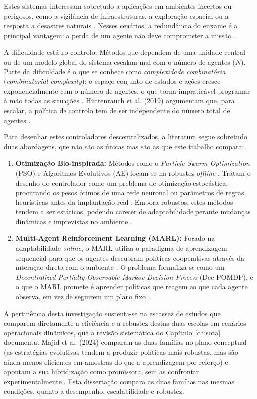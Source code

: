 \documentclass[12pt,reqno, twoside]{amsbook}
\theoremstyle{plain}
\numberwithin{equation}{chapter}
\numberwithin{section}{chapter}
\numberwithin{table}{chapter}
\numberwithin{figure}{chapter}
\begin{document}
Estes sistemas interessam sobretudo a aplicações em ambientes incertos ou perigosos, como a vigilância de infraestruturas, a exploração espacial ou a resposta a desastres naturais \cite{ekechi2025survey}. Nesses cenários, a redundância do enxame é a principal vantagem: a perda de um agente não deve comprometer a missão \cite{pina2024self}.

A dificuldade está no controlo. Métodos que dependem de uma unidade central ou de um modelo global do sistema escalam mal com o número de agentes ($N$). Parte da dificuldade é o que se conhece como \emph{complexidade combinatória} (\textit{combinatorial complexity}): o espaço conjunto de estados e ações cresce exponencialmente com o número de agentes, o que torna impraticável programar à mão todas as situações \cite{majid2023deep}. Hüttenrauch et al. (2019) argumentam que, para escalar, a política de controlo tem de ser independente do número total de agentes \cite{huttenrauch2019deep}.

Para desenhar estes controladores descentralizados, a literatura segue sobretudo duas abordagens, que não são as únicas mas são as que este trabalho compara:

\begin{enumerate}
    \item \textbf{Otimização Bio-inspirada:} Métodos como o \textit{Particle Swarm Optimization} (PSO) e Algoritmos Evolutivos (AE) focam-se na robustez \textit{offline} \cite{kennedy1995pso}. Tratam o desenho do controlador como um problema de otimização estocástica, procurando os pesos ótimos de uma rede neuronal ou parâmetros de regras heurísticas antes da implantação real \cite{hassen2025hybrid, salimans2017es}. Embora robustos, estes métodos tendem a ser estáticos, podendo carecer de adaptabilidade perante mudanças dinâmicas e imprevistas no ambiente \cite{somvanshi2025influx}.
    \item \textbf{Multi-Agent Reinforcement Learning (MARL):} Focado na adaptabilidade \textit{online}, o MARL utiliza o paradigma de aprendizagem sequencial para que os agentes descubram políticas cooperativas através da interação direta com o ambiente \cite{sutton2018reinforcement}. O problema formaliza-se como um \textit{Decentralized Partially Observable Markov Decision Process} (Dec-POMDP), e o que o MARL promete é aprender políticas que reagem ao que cada agente observa, em vez de seguirem um plano fixo \cite{huh2023marl}.
\end{enumerate}

A pertinência desta investigação sustenta-se na escassez de estudos que comparem diretamente a eficiência e a robustez destas duas escolas em cenários operacionais dinâmicos, que a revisão sistemática do Capítulo~\ref{ch:sota} documenta. Majid et al. (2024) comparam as duas famílias no plano conceptual (as estratégias evolutivas tendem a produzir políticas mais robustas, mas são ainda menos eficientes em amostras do que a aprendizagem por reforço) e apontam a sua hibridização como promissora, sem as confrontar experimentalmente \cite{majid2023deep}. Esta dissertação compara as duas famílias nas mesmas condições, quanto a desempenho, escalabilidade e robustez.
\end{document}

